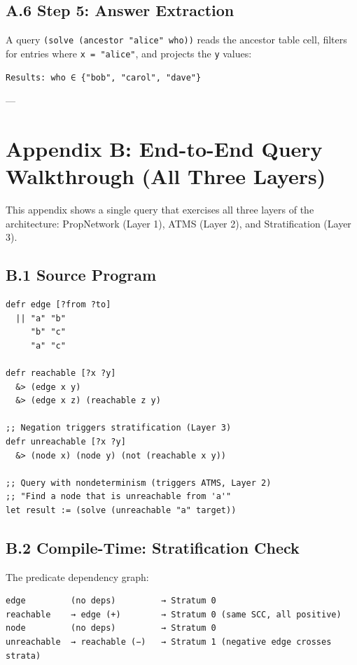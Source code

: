 \documentclass[11pt]{article}
\begin{document}
\subsection{A.6 Step 5: Answer Extraction}
\label{sec:org8e3a207}

A query \texttt{(solve (ancestor "alice" who))} reads the ancestor table cell,
filters for entries where \texttt{x = "alice"}, and projects the \texttt{y} values:

\begin{verbatim}
Results: who ∈ {"bob", "carol", "dave"}
\end{verbatim}

---
\section{Appendix B: End-to-End Query Walkthrough (All Three Layers)}
\label{sec:orgbe886e6}

This appendix shows a single query that exercises all three layers of the
architecture: PropNetwork (Layer 1), ATMS (Layer 2), and Stratification
(Layer 3).
\subsection{B.1 Source Program}
\label{sec:org3b4e4aa}

\begin{verbatim}
defr edge [?from ?to]
  || "a" "b"
     "b" "c"
     "a" "c"

defr reachable [?x ?y]
  &> (edge x y)
  &> (edge x z) (reachable z y)

;; Negation triggers stratification (Layer 3)
defr unreachable [?x ?y]
  &> (node x) (node y) (not (reachable x y))

;; Query with nondeterminism (triggers ATMS, Layer 2)
;; "Find a node that is unreachable from 'a'"
let result := (solve (unreachable "a" target))
\end{verbatim}
\subsection{B.2 Compile-Time: Stratification Check}
\label{sec:org971fe17}

The predicate dependency graph:

\begin{verbatim}
edge         (no deps)         → Stratum 0
reachable    → edge (+)        → Stratum 0 (same SCC, all positive)
node         (no deps)         → Stratum 0
unreachable  → reachable (−)   → Stratum 1 (negative edge crosses strata)
\end{verbatim}
\end{document}
